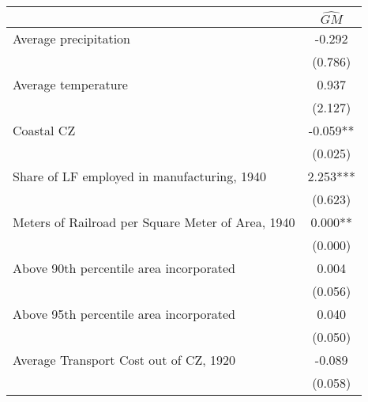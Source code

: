  \begin{tabular}{l*{1}{c}} \toprule
                &\multicolumn{1}{c}{$\widehat{GM}$}\\
\midrule
Average precipitation&   -0.292   \\
                &  (0.786)   \\
\addlinespace
Average temperature&    0.937   \\
                &  (2.127)   \\
\addlinespace
Coastal CZ      &   -0.059** \\
                &  (0.025)   \\
\addlinespace
Share of LF employed in manufacturing, 1940&    2.253***\\
                &  (0.623)   \\
\addlinespace
Meters of Railroad per Square Meter of Area, 1940&    0.000** \\
                &  (0.000)   \\
\addlinespace
Above 90th percentile area incorporated&    0.004   \\
                &  (0.056)   \\
\addlinespace
Above 95th percentile area incorporated&    0.040   \\
                &  (0.050)   \\
\addlinespace
Average Transport Cost out of CZ, 1920&   -0.089   \\
                &  (0.058)   \\
 \bottomrule \end{tabular}
